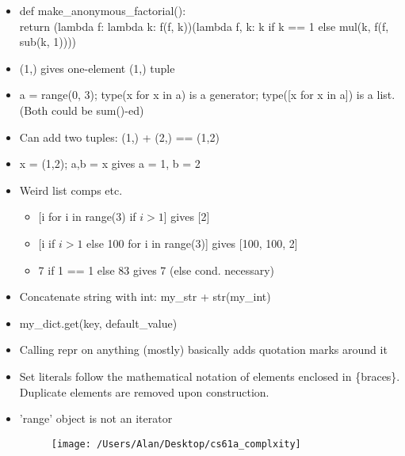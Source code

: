 \documentclass{article}
\begin{document}
\begin{itemize}
	\item def make\_anonymous\_factorial(): \\
	return (lambda f: lambda k: f(f, k))(lambda f, k: k if k == 1 else mul(k, f(f, sub(k, 1))))
	\item (1,) gives one-element (1,) tuple
	\item a = range(0, 3); type(x for x in a) is a generator; type([x for x in a]) is a list. (Both could be sum()-ed)
	\item Can add two tuples: (1,) + (2,) == (1,2)
	\item x = (1,2); a,b = x gives a = 1, b = 2
	\item Weird list comps etc.
	\begin{itemize}
		\item $[$i for i in range(3) if $i > 1$] gives [2]
		\item $[$i if $i > 1$ else 100 for i in range(3)] gives [100, 100, 2]
		\item 7 if 1 == 1 else 83 gives 7 (else cond. necessary)
	\end{itemize}
	\item Concatenate string with int: my\_str + str(my\_int)
	\item my\_dict.get(key, default\_value)
	\item Calling repr on anything (mostly) basically adds quotation marks around it
	\item Set literals follow the mathematical notation of elements enclosed in \{braces\}. Duplicate elements are removed upon construction.
	\item 'range' object is not an iterator
\begin{figure} [h!]
\begin{center}
	\texttt{[image: /Users/Alan/Desktop/cs61a\_complxity]}
	\label{fig}
\end{center}
\end{figure}
\end{itemize}
\end{document}

